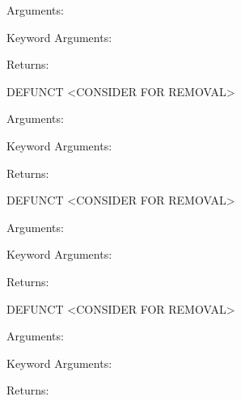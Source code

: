 \documentclass[letterpaper,10pt,english]{sphinxmanual}
\begin{document}

\begin{fulllineitems}
\label{retr:retr.__prim2convPositions}
Arguments:

Keyword Arguments:

Returns:

\end{fulllineitems}


\begin{fulllineitems}
\label{retr:retr.__pw2aflowConvention}
DEFUNCT \textless{}CONSIDER FOR REMOVAL\textgreater{}

Arguments:

Keyword Arguments:

Returns:

\end{fulllineitems}


\begin{fulllineitems}
\label{retr:retr.__pw2aflowConventionVec}
DEFUNCT \textless{}CONSIDER FOR REMOVAL\textgreater{}

Arguments:

Keyword Arguments:

Returns:

\end{fulllineitems}


\begin{fulllineitems}
\label{retr:retr.__pw2aflowPositions}
DEFUNCT \textless{}CONSIDER FOR REMOVAL\textgreater{}

Arguments:

Keyword Arguments:

Returns:

\end{fulllineitems}
\end{document}
